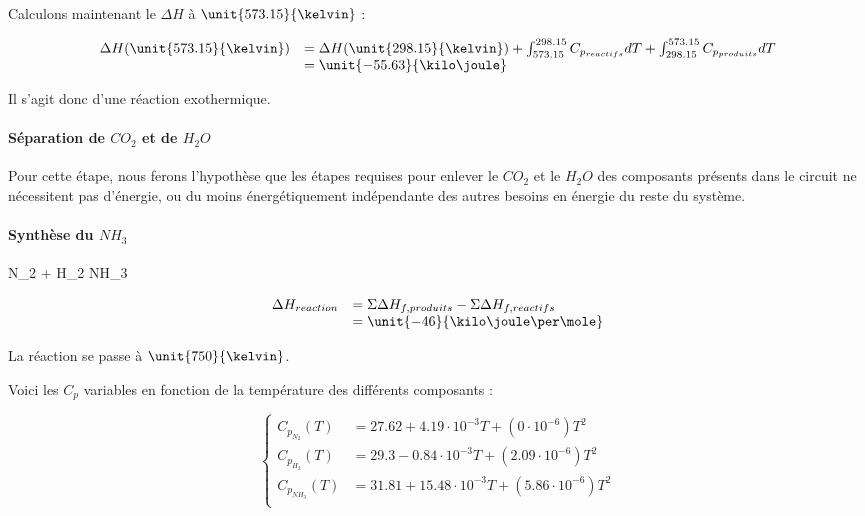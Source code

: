 Calculons maintenant le $\Delta H$ à $\unit{573.15}{\kelvin}$ :			

$$
	\begin{array}{rl}
		 	 \Delta H(\unit{573.15}{\kelvin})	&=  \Delta H(\unit{298.15}{\kelvin}) 
																							+ \int_{573.15}^{298.15} C_{p_{reactifs}} dT + \int_{298.15}^{573.15} C_{p_{produits}} dT \\
																				&=  \unit{-55.63}{\kilo\joule} %
	\end{array}
$$	
	
Il s'agit donc d'une réaction exothermique.

\paragraph{Séparation de $CO_{2}$ et de $H_{2}O$}		
Pour cette étape, nous ferons l'hypothèse que les étapes requises pour enlever le $CO_{2}$ et le $H_{2}O$ 
des composants présents dans le circuit ne nécessitent pas d'énergie, ou du moins énergétiquement indépendante 
des autres besoins en énergie du reste du système.

\paragraph{Synthèse du $NH_{3}$} 
\begin{chemmath}
		N_{2} + H_2 \Longrightarrow NH_3 
\end{chemmath}	

$$
	\begin{array}{rl}
	\Delta H_{reaction}		&= \Sigma \Delta H_{f,produits} - \Sigma \Delta H_{f,reactifs} \\
												&= \unit{-46}{\kilo\joule\per\mole}
	\end{array}
$$

La réaction se passe à $\unit{750}{\kelvin}$.
						
Voici les $C_p$ variables en fonction de la température des différents composants\cite{hc-table} :

$$
	\left\{
		\begin{array}{rl}
			C_{p_{N_2}}(T) 	&= 27.62 + 4.19\cdot10^{-3}T + (0\cdot10^{-6})T^2\\
			C_{p_{H_2}}(T)	&= 29.3 - 0.84\cdot10^{-3}T + (2.09\cdot10^{-6})T^2\\
			C_{p_{NH_3}}(T) 	&= 31.81 + 15.48\cdot10^{-3}T + (5.86\cdot10^{-6})T^2 \\
		\end{array}
	\right.
$$
					
